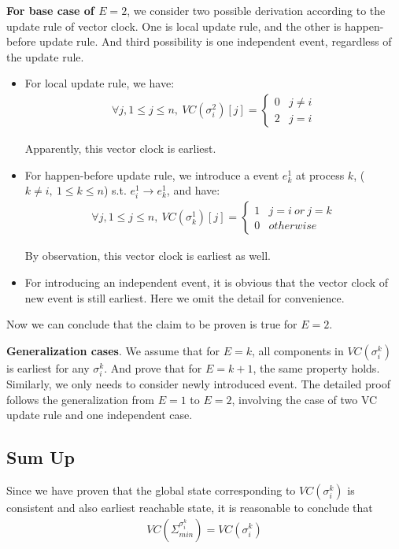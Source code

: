 \documentclass[11pt,a4paper]{article}
\begin{document}
    \textbf{For base case of $E = 2$}, we consider two possible derivation according to the update
    rule of vector clock. One is local update rule, and the other is
    happen-before update rule. And third possibility is one independent event,
    regardless of the update rule.

    \begin{itemize}

        \item{For local update rule, we have: }
    \begin{eqnarray}
       \forall j, 1 \leq j \leq n,\ VC(\sigma_i^2)[j] = 
        \begin{cases}
            0   & j \neq i \\
            2   & j = i
        \end{cases}
    \end{eqnarray}

    Apparently, this vector clock is earliest.
    
\item{For happen-before update rule, we introduce a event $e_k^1$ at process
        $k$, ($k \neq i,\ 1 \leq k \leq n$) s.t. $e_i^1
        \rightarrow e_k^1$, and have: }
    \begin{eqnarray}
       \forall j, 1 \leq j \leq n,\  VC(\sigma_k^1)[j] = 
        \begin{cases}
            1   & j = i\ or\ j = k \\
            0   & otherwise
        \end{cases}
    \end{eqnarray}

    By observation, this vector clock is earliest as well.

\item{For introducing an independent event, it is obvious that the vector clock
        of new event is still earliest. Here we omit the detail for convenience.}
    \end{itemize}

    Now we can conclude that the claim to be proven is true for $E = 2$.

    \textbf{Generalization cases}. We assume that for $E = k$, all components
    in $VC(\sigma_i^k)$ is earliest for any $\sigma_i^k$. And prove that for
    $E = k + 1$, the same property holds. Similarly, we only needs to consider
    newly introduced event. The detailed proof follows the generalization from
    $E = 1$ to $E = 2$, involving the case of two VC update rule and one
    independent case. 
    
\subsection{Sum Up}
Since we have proven that the global state corresponding to $VC(\sigma_i^k)$
is consistent and also earliest reachable state, it is reasonable to conclude
that 
\begin{align}
 VC (\Sigma_{min}^{\sigma_i^k}) = VC (\sigma_i^k)
\end{align}

\end{document}
